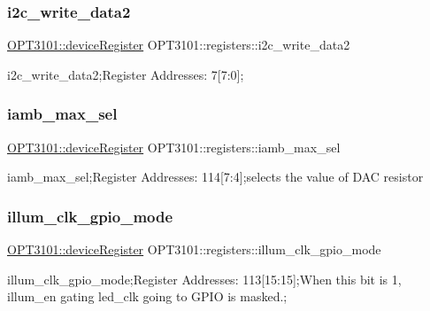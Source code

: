 \subsubsection{\texorpdfstring{i2c\+\_\+write\+\_\+data2}{i2c\_write\_data2}}
{\footnotesize\ttfamily \mbox{\hyperlink{class_o_p_t3101_1_1device_register}{O\+P\+T3101\+::device\+Register}} O\+P\+T3101\+::registers\+::i2c\+\_\+write\+\_\+data2}



i2c\+\_\+write\+\_\+data2;Register Addresses\+: 7\mbox{[}7\+:0\mbox{]}; 

\mbox{\label{class_o_p_t3101_1_1registers_a328356a6de5554db76c6f85b26e1aac4}} 
\subsubsection{\texorpdfstring{iamb\+\_\+max\+\_\+sel}{iamb\_max\_sel}}
{\footnotesize\ttfamily \mbox{\hyperlink{class_o_p_t3101_1_1device_register}{O\+P\+T3101\+::device\+Register}} O\+P\+T3101\+::registers\+::iamb\+\_\+max\+\_\+sel}



iamb\+\_\+max\+\_\+sel;Register Addresses\+: 114\mbox{[}7\+:4\mbox{]};selects the value of D\+AC resistor 

\mbox{\label{class_o_p_t3101_1_1registers_a96d3a8085b94d0560f8e8c8f7611aaab}} 
\subsubsection{\texorpdfstring{illum\+\_\+clk\+\_\+gpio\+\_\+mode}{illum\_clk\_gpio\_mode}}
{\footnotesize\ttfamily \mbox{\hyperlink{class_o_p_t3101_1_1device_register}{O\+P\+T3101\+::device\+Register}} O\+P\+T3101\+::registers\+::illum\+\_\+clk\+\_\+gpio\+\_\+mode}



illum\+\_\+clk\+\_\+gpio\+\_\+mode;Register Addresses\+: 113\mbox{[}15\+:15\mbox{]};When this bit is \textquotesingle{}1\textquotesingle{}, illum\+\_\+en gating led\+\_\+clk going to G\+P\+IO is masked.; 


